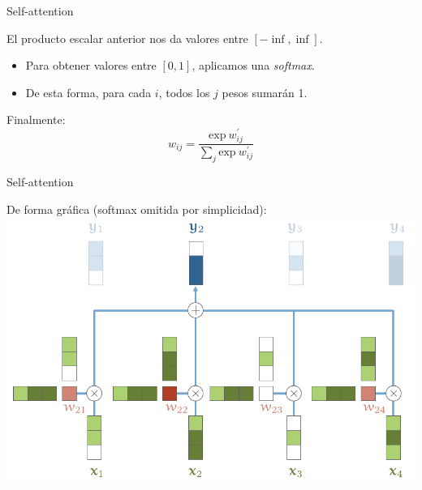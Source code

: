 \documentclass[aspectratio=169]{beamer}
\begin{document}
\begin{frame}{Self-attention}

  El producto escalar anterior nos da valores entre $[-\inf, \inf]$.
  \begin{itemize}
    \item Para obtener valores entre $[0,1]$, aplicamos una \textit{softmax}.
    \item De esta forma, para cada $i$, todos los $j$ pesos sumarán 1.
  \end{itemize}

  \vspace{.3cm}
  Finalmente: 
  \begin{equation*}
    w_{ij} = \frac{\text{exp}\ w^{'}_{ij}}{\sum_{j} \text{exp}\ w^{'}_{ij}}
  \end{equation*}

\end{frame}

\begin{frame}{Self-attention}

  De forma gráfica (softmax omitida por simplicidad):\\
  \vspace{.3cm}
  \includegraphics[width=.65\textwidth, center]{imgs/tema4/att/SAT_basic.pdf}

\end{frame}
\end{document}
